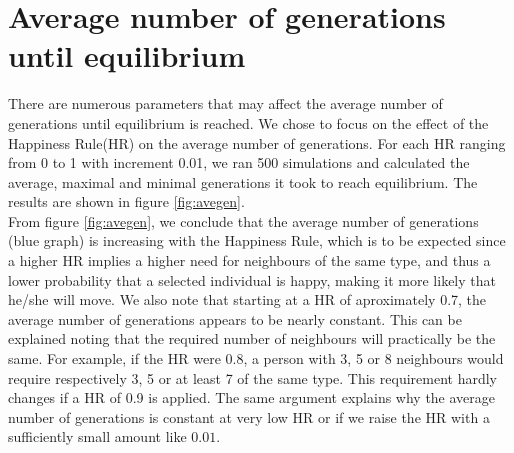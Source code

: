 
\section{Average number of generations until equilibrium}\label{sec:aantgen}
There are numerous parameters that may affect the average number of generations until  equilibrium is reached. 
We chose to focus on the effect of the Happiness Rule(HR) on the average number of generations. 
For each HR ranging from 0 to 1 with increment 0.01, we ran 500 simulations and calculated the average, maximal and minimal generations it took to reach equilibrium. 
The results are shown in figure \ref{fig:avegen}.\\

From figure \ref{fig:avegen}, we conclude that the average number of generations (blue graph) is increasing with the Happiness Rule, which is to be expected since a higher HR implies a higher need for neighbours of the same type, and thus a lower probability that a selected individual is happy, making it more likely that he/she will move. 
We also note that starting at a HR of aproximately 0.7, the average number of generations appears to be nearly constant. 
This can be explained noting that the required number of neighbours will practically be the same. 
For example, if the HR were 0.8, a person with 3, 5 or 8 neighbours would require respectively 3, 5 or at least 7 of the same type. 
This requirement hardly changes if a HR of 0.9 is applied. 
The same argument explains why the average number of generations is constant at very low HR or if we raise the HR with a sufficiently small amount like $0.01$.

